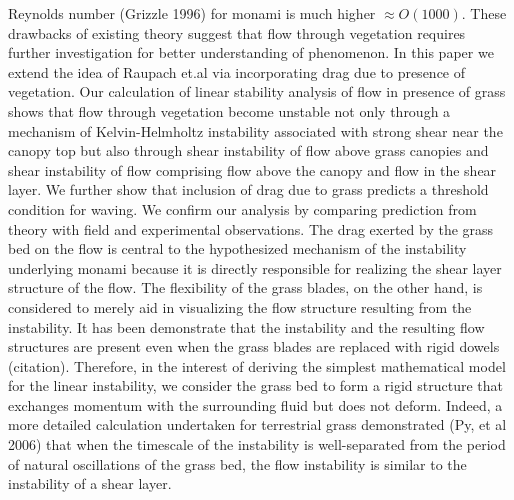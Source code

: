 \documentclass[aps,prl,twocolumn,showpacs,superscriptaddress,groupedaddress,10pt]{revtex4-1}  %
\begin{document}
Reynolds number\cite{Grizzle96} (Grizzle 1996) for monami is much higher $\approx O(1000)$. These drawbacks of existing theory suggest that flow through vegetation requires 
further investigation for better understanding of phenomenon.
\newline 
In this paper we extend the idea of Raupach et.al\cite{Raupach96} via incorporating drag due to presence of vegetation. Our calculation of linear stability analysis of flow in presence of grass
shows that flow through vegetation become unstable not only through a mechanism of Kelvin-Helmholtz 
instability associated with strong shear near the canopy top but also through shear instability of flow above grass canopies and shear instability of flow comprising flow above the canopy 
and flow in the shear layer. We further show that inclusion of drag due to grass predicts a threshold condition for waving. We confirm our analysis by comparing prediction from theory 
with field and experimental observations.
\newline  
The drag exerted by the grass bed on the flow is central to the hypothesized mechanism\cite{Ghisal02} of the instability underlying monami because it is directly responsible for realizing the shear layer structure of the flow. The flexibility of the grass blades, on the other hand, is considered to merely aid in visualizing the flow structure resulting from the instability. It has been demonstrate that the instability and the resulting flow structures are present even when the grass blades are replaced with rigid dowels (citation). Therefore, in the interest of deriving the simplest mathematical model for the linear instability, we consider the grass bed to form a rigid structure that exchanges momentum with the surrounding fluid but does not deform. Indeed, a more detailed calculation undertaken for terrestrial grass demonstrated (Py, et al 2006) that when the timescale of the instability is well-separated from the period of natural oscillations of the grass bed, the flow instability is similar to the instability of a shear layer. 
\end{document}
